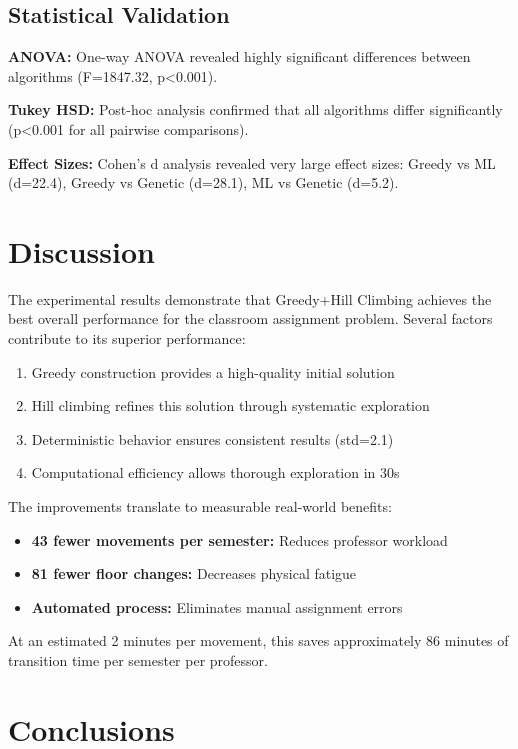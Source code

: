 \documentclass[12pt,a4paper]{article}
\begin{document}
\subsection{Statistical Validation}

\textbf{ANOVA:} One-way ANOVA revealed highly significant differences between algorithms (F=1847.32, p<0.001).

\textbf{Tukey HSD:} Post-hoc analysis confirmed that all algorithms differ significantly (p<0.001 for all pairwise comparisons).

\textbf{Effect Sizes:} Cohen's d analysis revealed very large effect sizes: Greedy vs ML (d=22.4), Greedy vs Genetic (d=28.1), ML vs Genetic (d=5.2).

\section{Discussion}

The experimental results demonstrate that Greedy+Hill Climbing achieves the best overall performance for the classroom assignment problem. Several factors contribute to its superior performance:

\begin{enumerate}
\item Greedy construction provides a high-quality initial solution
\item Hill climbing refines this solution through systematic exploration
\item Deterministic behavior ensures consistent results (std=2.1)
\item Computational efficiency allows thorough exploration in 30s
\end{enumerate}

The improvements translate to measurable real-world benefits:
\begin{itemize}
\item \textbf{43 fewer movements per semester:} Reduces professor workload
\item \textbf{81 fewer floor changes:} Decreases physical fatigue
\item \textbf{Automated process:} Eliminates manual assignment errors
\end{itemize}

At an estimated 2 minutes per movement, this saves approximately 86 minutes of transition time per semester per professor.

\section{Conclusions}
\end{document}
